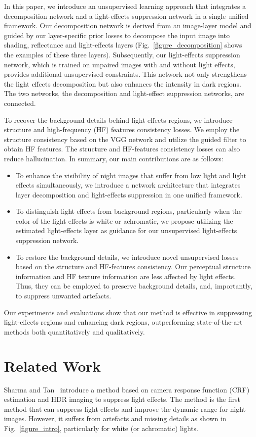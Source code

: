 \documentclass[runningheads]{llncs}
\begin{document}
In this paper, we introduce an unsupervised learning approach that integrates a decomposition network and a light-effects suppression network in a single unified framework.
Our decomposition network is derived from an image-layer model and guided by our layer-specific prior losses to decompose the input image into shading, reflectance and light-effects layers (Fig.~\ref{figure_decomposition} shows the examples of these three layers).
Subsequently, our light-effects suppression network, which is trained on unpaired images with and without light effects, provides additional unsupervised constraints. 
This network not only strengthens the light effects decomposition but also enhances the intensity in dark regions.
The two networks, the decomposition and light-effect suppression networks, are connected.


To recover the background details behind light-effects regions, we introduce structure and high-frequency (HF) features consistency losses.
We employ the structure consistency based on the VGG network and utilize the guided filter to obtain HF features.
The structure and HF-features consistency losses can also reduce hallucination.
In summary, our main contributions are as follows:
\begin{itemize}
	\item 
	To enhance the visibility of night images that suffer from low light and light effects simultaneously, we introduce a network architecture that integrates layer decomposition and light-effects suppression in one unified framework.
\item
	To distinguish light effects from background regions, particularly when the color of the light effects is white or achromatic, we propose utilizing the estimated light-effects layer as guidance for our unsupervised light-effects suppression network.
\item 	
	To restore the background details, we introduce novel unsupervised losses based on the structure and HF-features consistency.
	Our perceptual structure information and HF texture information are less affected by light effects. Thus, they can be employed to preserve background details, and, importantly, to suppress unwanted artefacts.
\end{itemize}
Our experiments and evaluations show that our method is effective in suppressing light-effects regions and enhancing dark regions, outperforming state-of-the-art methods both quantitatively and qualitatively.

\section{Related Work}
\label{sec:related_work}
Sharma and Tan~\cite{sharma2021nighttime} introduce a method based on camera response function (CRF) estimation and HDR imaging to suppress light effects. The method is the first method that can suppress light effects and improve the dynamic range for night images.
However, it suffers from artefacts and missing details as shown in Fig.~\ref{figure_intro}, particularly for white (or achromatic) lights.
\end{document}
